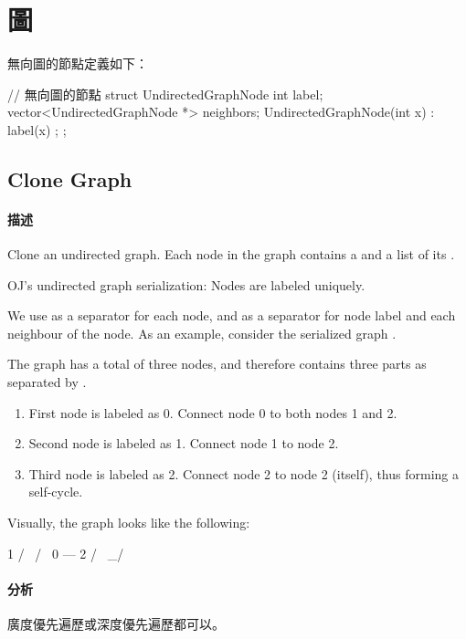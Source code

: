 \chapter{圖}

無向圖的節點定義如下：
\begin{Code}
// 無向圖的節點
struct UndirectedGraphNode {
    int label;
    vector<UndirectedGraphNode *> neighbors;
    UndirectedGraphNode(int x) : label(x) {};
};
\end{Code}


\section{Clone Graph} %
\label{sec:clone-graph}


\subsubsection{描述}
Clone an undirected graph. Each node in the graph contains a  and a list of its .


OJ's undirected graph serialization:
Nodes are labeled uniquely.

We use \code{\#} as a separator for each node, and \code{,} as a separator for node label and each neighbour of the node.
As an example, consider the serialized graph .

The graph has a total of three nodes, and therefore contains three parts as separated by \code{\#}.
\begin{enumerate}
\item First node is labeled as 0. Connect node 0 to both nodes 1 and 2.
\item Second node is labeled as 1. Connect node 1 to node 2.
\item Third node is labeled as 2. Connect node 2 to node 2 (itself), thus forming a self-cycle.
\end{enumerate}

Visually, the graph looks like the following:
\begin{Code}
       1
      / \
     /   \
    0 --- 2
         / \
         \_/
\end{Code}


\subsubsection{分析}
廣度優先遍歷或深度優先遍歷都可以。


